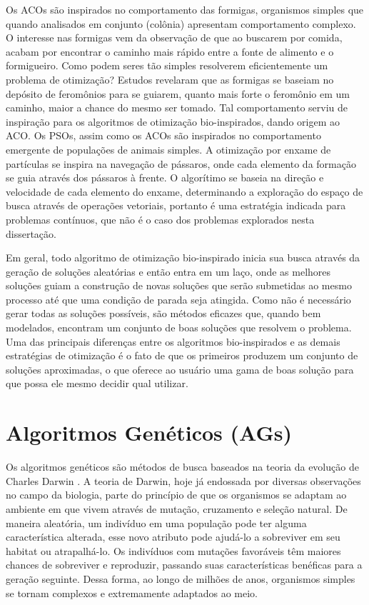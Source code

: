 Os ACOs são inspirados no comportamento das formigas, organismos simples que quando analisados em conjunto (colônia) apresentam comportamento complexo. O interesse nas formigas vem da observação de que ao buscarem por comida, acabam por encontrar o caminho mais rápido entre a fonte de alimento e o formigueiro. Como podem seres tão simples resolverem eficientemente um problema de otimização? Estudos revelaram que as formigas se baseiam no depósito de feromônios para se guiarem, quanto mais forte o feromônio em um caminho, maior a chance do mesmo ser tomado. Tal comportamento serviu de inspiração para os algoritmos de otimização bio-inspirados, dando origem ao ACO. Os PSOs, assim como os ACOs são inspirados no comportamento emergente de populações de animais simples. A otimização por enxame de partículas se inspira na navegação de pássaros, onde cada elemento da formação se guia através dos pássaros à frente. O algorítimo se baseia na direção e velocidade de cada elemento do enxame, determinando a exploração do espaço de busca através de operações vetoriais, portanto é uma estratégia indicada para problemas contínuos, que não é o caso dos problemas explorados nesta dissertação.

Em geral, todo algoritmo de otimização bio-inspirado inicia sua busca através da geração de soluções aleatórias e então entra em um laço, onde as melhores soluções guiam a construção de novas soluções que serão submetidas ao mesmo processo até que uma condição de parada seja atingida. Como não é necessário gerar todas as soluções possíveis, são métodos eficazes que, quando bem modelados, encontram um conjunto de boas soluções que resolvem o problema. Uma das principais diferenças entre os algoritmos bio-inspirados e as demais estratégias de otimização é o fato de que os primeiros produzem um conjunto de soluções aproximadas, o que oferece ao usuário uma gama de boas solução para que possa ele mesmo decidir qual utilizar.

\section{Algoritmos Genéticos (AGs)}
\label{section_ag}
Os algoritmos genéticos são métodos de busca baseados na teoria da evolução de Charles Darwin \cite{Darwin1859}. A teoria de Darwin, hoje já endossada por diversas observações no campo da biologia, parte do princípio de que os organismos se adaptam ao ambiente em que vivem através de mutação, cruzamento e seleção natural. De maneira aleatória, um indivíduo em uma população pode ter alguma característica alterada, esse novo atributo pode ajudá-lo a sobreviver em seu habitat ou atrapalhá-lo. Os indivíduos com mutações favoráveis têm maiores chances de sobreviver e reproduzir, passando suas características benéficas para a geração seguinte. Dessa forma, ao longo de milhões de anos, organismos simples se tornam complexos e extremamente adaptados ao meio.

